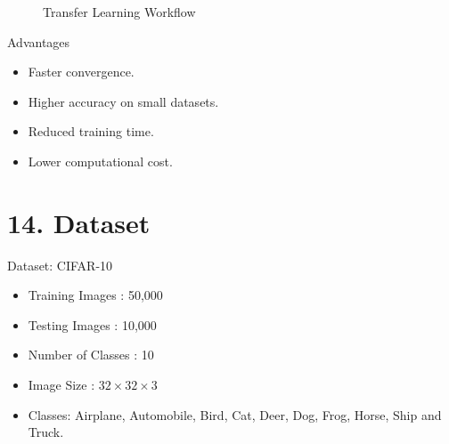\documentclass[11pt]{article}
\begin{document}
\begin{figure}[H]
\centering


\caption{Transfer Learning Workflow}

\end{figure}

Advantages

\begin{itemize}
\item Faster convergence.
\item Higher accuracy on small datasets.
\item Reduced training time.
\item Lower computational cost.
\end{itemize}


\section*{14. Dataset}

Dataset: CIFAR-10

\begin{itemize}

\item Training Images : 50,000

\item Testing Images : 10,000

\item Number of Classes : 10

\item Image Size : $32\times32\times3$

\item Classes:
Airplane, Automobile, Bird, Cat, Deer,
Dog, Frog, Horse, Ship and Truck.

\end{itemize}
\end{document}
